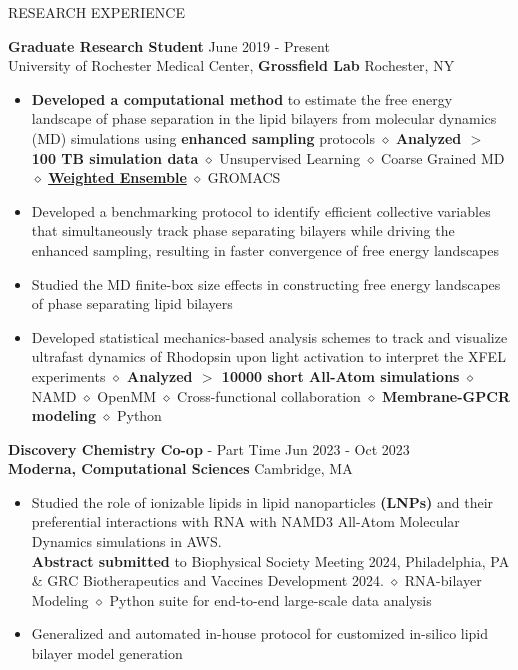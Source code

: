 \documentclass{resume} %
\begin{document}
\begin{rSection}{RESEARCH EXPERIENCE}

   \textbf{Graduate Research Student} \hfill June 2019 - Present\\
   University of Rochester Medical Center, \textbf{Grossfield Lab} \hfill Rochester, NY
   \begin{itemize}
      \itemsep -1pt {}
      \item \textbf{Developed a computational method} to estimate the free energy landscape of phase separation in the lipid bilayers from molecular dynamics (MD) simulations using \textbf{enhanced sampling} protocols
            $\diamond$ \textbf{Analyzed $>$ 100 TB simulation data} $\diamond$ Unsupervised Learning $\diamond$ Coarse Grained MD $\diamond$ \textbf{\href{https://x.com/poruthoor/status/1631815905557479426?s=20}{Weighted Ensemble}} $\diamond$ GROMACS
      \item Developed a benchmarking protocol to identify efficient collective variables that simultaneously track phase separating bilayers while driving the enhanced sampling, resulting in faster convergence of free energy landscapes
      \item Studied the MD finite-box size effects in constructing free energy landscapes of phase separating lipid bilayers
      \item Developed statistical mechanics-based analysis schemes to track and visualize ultrafast dynamics of Rhodopsin upon light activation to interpret the XFEL experiments \textbf{$\diamond$ Analyzed $>$ 10000 short All-Atom simulations}
            $\diamond$ NAMD $\diamond$ OpenMM $\diamond$ Cross-functional collaboration $\diamond$  \textbf{Membrane-GPCR modeling} $\diamond$ Python
   \end{itemize}

   \textbf{Discovery Chemistry Co-op} - Part Time \hfill Jun 2023 - Oct 2023\\
   \textbf{Moderna, Computational Sciences} \hfill {Cambridge, MA}
   \begin{itemize}
      \itemsep -1pt {}
      \item Studied the role of ionizable lipids in lipid nanoparticles \textbf{(LNPs)} and their preferential interactions with RNA with NAMD3 All-Atom Molecular Dynamics simulations in AWS.\\
            \textbf{Abstract submitted} to Biophysical Society Meeting 2024, Philadelphia, PA \& GRC Biotherapeutics and Vaccines Development 2024.
            $\diamond$ RNA-bilayer Modeling $\diamond$ Python suite for end-to-end large-scale data analysis
      \item Generalized and automated in-house protocol for customized in-silico lipid bilayer model generation
   \end{itemize}


\end{rSection}
\end{document}
